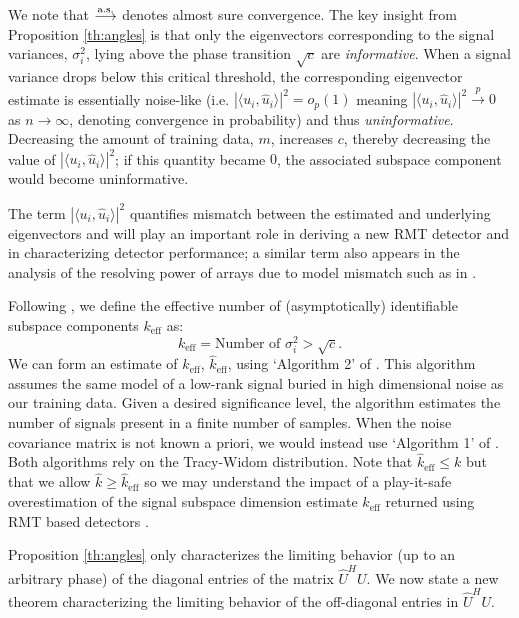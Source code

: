 We note that $\overset{\textrm{a.s.}}{\longrightarrow}$ denotes almost sure convergence. The key insight from Proposition \ref{th:angles} is that only the eigenvectors corresponding to the signal variances, $\sigma_i^2$, lying above the phase transition $\sqrt{c}$ are \textit{informative}. When a signal variance drops below this critical threshold, the corresponding eigenvector estimate is essentially noise-like  (i.e. $|\langle u_i,\widehat{u}_i\rangle|^2=o_{p}(1)$ meaning $|\langle u_i,\widehat{u}_i\rangle|^2\overset{p}{\to}0$ as $n\to\infty$, denoting convergence in probability) and thus \textit{uninformative}. Decreasing the amount of training data, $m$, increases $c$, thereby decreasing the value of $|\langle u_i,\widehat{u}_i\rangle|^2$; if this quantity became $0$, the associated subspace component would become uninformative.

The term $|\langle u_i,\widehat{u}_i\rangle|^2$ quantifies mismatch between the estimated and underlying eigenvectors and will play an important role in deriving a new RMT detector and in characterizing detector performance; a similar term also appears in the analysis of the resolving power of arrays due to model mismatch such as in \cite{cox1973resolving}.


Following \cite{nadakuditi2008sample}, we define the effective number of (asymptotically) identifiable subspace components $k_\text{eff}$ as:
\begin{equation}\label{eq:keff}
\boxed{k_\text{eff} = \text{Number of } \sigma_i^2 > \sqrt{c}}.
\end{equation}
We can form an estimate of $k_\text{eff}$, $\widehat{k}_{\text{eff}}$, using  `Algorithm 2' of  \cite{nadakuditi2010fundamental}. This algorithm assumes the same model of a low-rank signal buried in high dimensional noise as our training data. Given a desired significance level, the algorithm estimates the number of signals present in a finite number of samples. When the noise covariance matrix is not known a priori, we would instead use `Algorithm 1' of \cite{nadakuditi2010fundamental}. Both algorithms rely on the Tracy-Widom distribution. Note that $\widehat{k}_{\text{eff}} \leq k$ but that we allow $\widehat{k} \geq \widehat{k}_{\text{eff}}$ so we may understand the impact of a play-it-safe overestimation of the signal subspace dimension estimate $\widehat{k}_{\text{eff}}$  returned using RMT based detectors \cite{nadakuditi2010fundamental,johnstone2001distribution,el2007tracy}.

Proposition \ref{th:angles} only characterizes the limiting behavior (up to an arbitrary phase) of  the diagonal entries of the matrix $\widehat{U}^HU$. We now state a new theorem characterizing the limiting behavior of the off-diagonal entries in $\widehat{U}^HU$.

